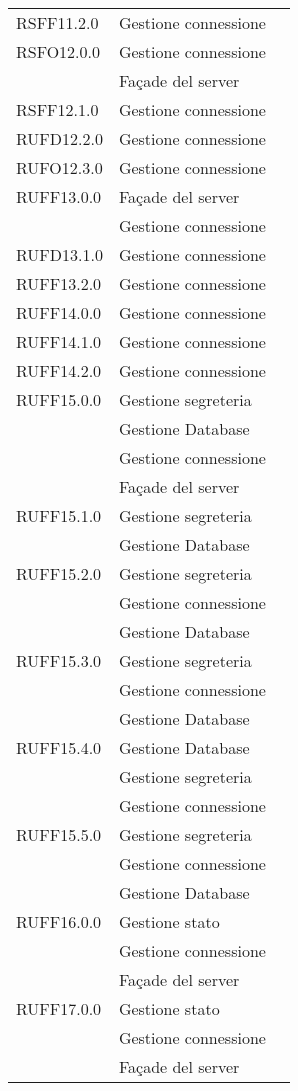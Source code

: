 \begin{center}
\begin{longtable}{lp{}l}
RSFF11.2.0 & Gestione connessione \\
RSFO12.0.0 & Gestione connessione \\
 & Façade del server \\
RSFF12.1.0 & Gestione connessione \\
RUFD12.2.0 & Gestione connessione \\
RUFO12.3.0 & Gestione connessione \\
RUFF13.0.0 & Façade del server \\
 & Gestione connessione \\
RUFD13.1.0 & Gestione connessione \\
RUFF13.2.0 & Gestione connessione \\
RUFF14.0.0 & Gestione connessione \\
RUFF14.1.0 & Gestione connessione \\
RUFF14.2.0 & Gestione connessione \\
RUFF15.0.0 & Gestione segreteria \\
 & Gestione Database \\
 & Gestione connessione \\
 & Façade del server \\
RUFF15.1.0 & Gestione segreteria \\
 & Gestione Database \\
RUFF15.2.0 & Gestione segreteria \\
 & Gestione connessione \\
 & Gestione Database \\
RUFF15.3.0 & Gestione segreteria \\
 & Gestione connessione \\
 & Gestione Database \\
RUFF15.4.0 & Gestione Database \\
 & Gestione segreteria \\
 & Gestione connessione \\
RUFF15.5.0 & Gestione segreteria \\
 & Gestione connessione \\
 & Gestione Database \\
RUFF16.0.0 & Gestione stato \\
 & Gestione connessione \\
 & Façade del server \\
RUFF17.0.0 & Gestione stato \\
 & Gestione connessione \\
 & Façade del server \\

\end{longtable}
\end{center}
